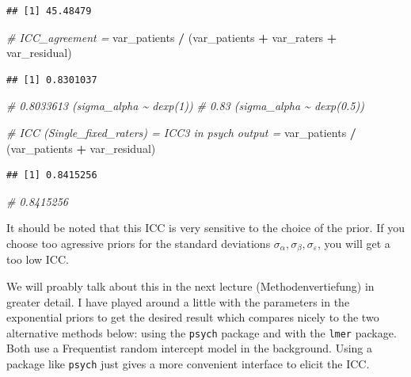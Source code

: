 \documentclass[
]{book}
\newenvironment{Shaded}{\begin{snugshade}}{\end{snugshade}}
\newcommand{\CommentTok}[1]{\textcolor[rgb]{0.56,0.35,0.01}{\textit{#1}}}
\newcommand{\NormalTok}[1]{#1}
\newcommand{\SpecialCharTok}[1]{\textcolor[rgb]{0.81,0.36,0.00}{\textbf{#1}}}
\begin{document}
\begin{verbatim}
## [1] 45.48479
\end{verbatim}

\begin{Shaded}
\begin{Highlighting}[]
\CommentTok{\# ICC\_agreement = }
\NormalTok{var\_patients }\SpecialCharTok{/}\NormalTok{ (var\_patients }\SpecialCharTok{+}\NormalTok{ var\_raters }\SpecialCharTok{+}\NormalTok{ var\_residual)}
\end{Highlighting}
\end{Shaded}

\begin{verbatim}
## [1] 0.8301037
\end{verbatim}

\begin{Shaded}
\begin{Highlighting}[]
\CommentTok{\# 0.8033613 (sigma\_alpha \textasciitilde{} dexp(1))}
\CommentTok{\# 0.83 (sigma\_alpha \textasciitilde{} dexp(0.5))}

\CommentTok{\# ICC (Single\_fixed\_raters) = ICC3 in psych output = }
\NormalTok{var\_patients }\SpecialCharTok{/}\NormalTok{ (var\_patients }\SpecialCharTok{+}\NormalTok{ var\_residual)}
\end{Highlighting}
\end{Shaded}

\begin{verbatim}
## [1] 0.8415256
\end{verbatim}

\begin{Shaded}
\begin{Highlighting}[]
\CommentTok{\# 0.8415256}
\end{Highlighting}
\end{Shaded}

It should be noted that this ICC is very sensitive to the choice of the prior.
If you choose too agressive priors for the standard deviations \(\sigma_{\alpha},
\sigma_{\beta}, \sigma_{\varepsilon}\), you will get a too low ICC.

We will proably talk about this in the next lecture (Methodenvertiefung) in greater detail.
I have played around a little with the parameters in the exponential priors
to get the desired result which compares nicely to the two alternative methods below:
using the \texttt{psych} package and with the \texttt{lmer}
package. Both use a Frequentist random intercept model in the background.
Using a package like \texttt{psych} just gives a more convenient interface to
elicit the ICC.
\end{document}
